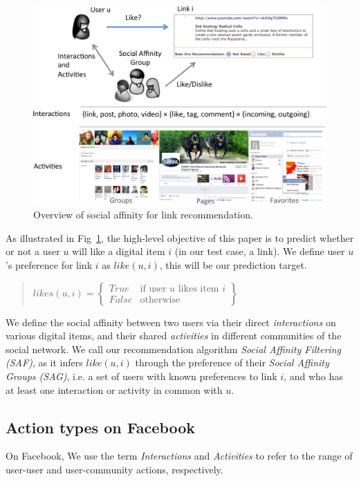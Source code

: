 
\begin{figure}[t!]
\centering
\includegraphics[width=.95\linewidth]{data/overview}
\caption{Overview of social affinity for link recommendation.}
\label{fig:overview}
\end{figure}


As illustrated in Fig~\ref{fig:overview}, the high-level objective of this paper is to predict whether or not a user $u$ will like a digital item $i$ (in our test case, a link). 
We define user $u$'s preference for link $i$ as $like(u,i)$, this will be our prediction target. 
\begin{quote}
\begin{math}
likes(u,i) =  \begin{Bmatrix}
	  True & \text{if user $u$ likes item $i$}\\
	  False & \text{otherwise}
	  \end{Bmatrix}
\end{math}
\end{quote}

We define the social affinity between two users via their direct {\em interactions}
on various digital items, and their shared {\em activities} in different communities of the social network. 
We call our recommendation algorithm \textit{Social Affinity Filtering (SAF)}, as it infers 
$like(u,i)$ through the preference of their 
\textit{ Social Affinity Groups (SAG)}, i.e. a set of users with known preferences to link $i$, and who has at least one interaction or activity in common with $u$. 

\subsection{Action types on Facebook}
On Facebook, We use the term {\em Interactions} and {\em Activities} to refer to the range of user-user and user-community actions, respectively.

